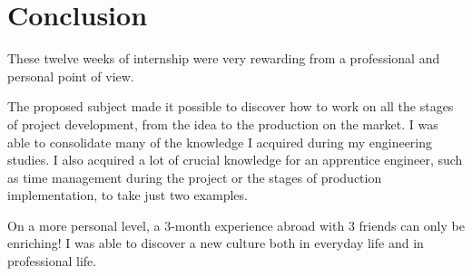 \chapter{Conclusion}
\label{chapter:bilan_en}

These twelve weeks of internship were very rewarding from a professional and personal point of view.

The proposed subject made it possible to discover how to work on all the stages of project development, from the idea to the production on the market. I was able to consolidate many of the knowledge I acquired during my engineering studies. I also acquired a lot of crucial knowledge for an apprentice engineer, such as time management during the project or the stages of production implementation, to take just two examples.

On a more personal level, a 3-month experience abroad with 3 friends can only be enriching! I was able to discover a new culture both in everyday life and in professional life.
